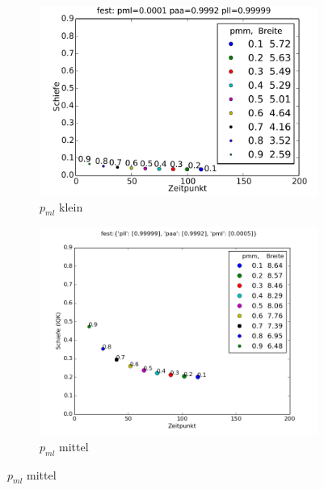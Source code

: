 \begin{figure}[H]
\begin{subfigure}{0.6\textwidth}
\includegraphics[width=\textwidth]{bilder/pmm/3fest_p_00001_09992_099999}
\caption{$p_{ml}$ klein}
\end{subfigure}

\begin{subfigure}{0.6\textwidth}
\includegraphics[width=\textwidth]{bilder/pmm/3fest_p_00005_09992_099999}
\caption{$p_{ml}$ mittel}
\end{subfigure}


\end{figure}
